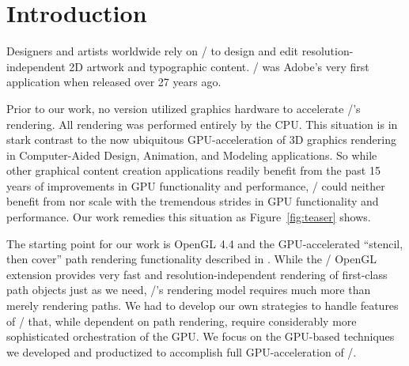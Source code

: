 
\section{Introduction}
\label{sec:intro}


\copyrightspace

Designers and artists worldwide rely on \AdobeIllustrator/
to design and edit
resolution-independent 2D artwork and typographic content.
\Illustrator/ was Adobe's very first application when released over 27 years ago.

Prior to our work, no version utilized graphics hardware to accelerate \Illustrator/'s rendering.
All rendering was performed entirely by the CPU.
This situation is in stark contrast to the now ubiquitous GPU-acceleration of 3D graphics rendering
in Computer-Aided Design, Animation, and Modeling applications.  So while other graphical content creation applications
readily benefit from the past 15 years of improvements in GPU functionality and performance, \Illustrator/
could neither benefit from nor scale with the tremendous strides in GPU functionality and performance.
Our work remedies this situation as Figure~\ref{fig:teaser} shows.

The starting point for our work is OpenGL 4.4 \cite{GL44spec}
and the GPU-accelerated ``stencil, then cover'' path rendering functionality described in \cite{KilgardBolz2012}.
While the \NVpr/ OpenGL extension \cite{NVpr}
provides very fast and resolution-independent rendering of first-class path objects just as we need, \Illustrator/'s
rendering model requires much more than merely rendering paths.  
We had to develop our own strategies to handle features of
\Illustrator/ that, while dependent on path rendering, require considerably more sophisticated orchestration of the GPU.
We focus on the GPU-based techniques we developed and productized to accomplish
full GPU-acceleration of \Illustrator/.

